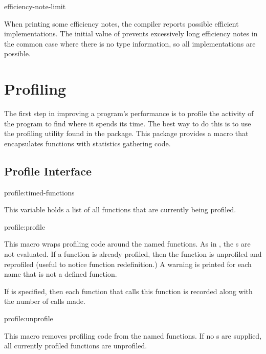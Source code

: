 \begin{defvar}{}{efficiency-note-limit}
  
  When printing some efficiency notes, the compiler reports possible
  efficient implementations.  The initial value of  prevents
  excessively long efficiency notes in the common case where there is
  no type information, so all implementations are possible.
\end{defvar}


\section{Profiling}
\label{profiling}

The first step in improving a program's performance is to profile the
activity of the program to find where it spends its time.  The best
way to do this is to use the profiling utility found in the
 package.  This package provides a macro 
that encapsulates functions with statistics gathering code.


\subsection{Profile Interface}

\begin{defvar}{profile:}{timed-functions}
  
  This variable holds a list of all functions that are currently being
  profiled.
\end{defvar}

\begin{defmac}{profile:}{profile}{%
    }
  
  This macro wraps profiling code around the named functions.  As in
  , the s are not evaluated.  If a function is
  already profiled, then the function is unprofiled and reprofiled
  (useful to notice function redefinition.)  A warning is printed for
  each name that is not a defined function.
  
  If  is specified, then each function that calls
  this function is recorded along with the number of calls made.
\end{defmac}

\begin{defmac}{profile:}{unprofile}{%
    }
  
  This macro removes profiling code from the named functions.  If no
  s are supplied, all currently profiled functions are
  unprofiled.
\end{defmac}

